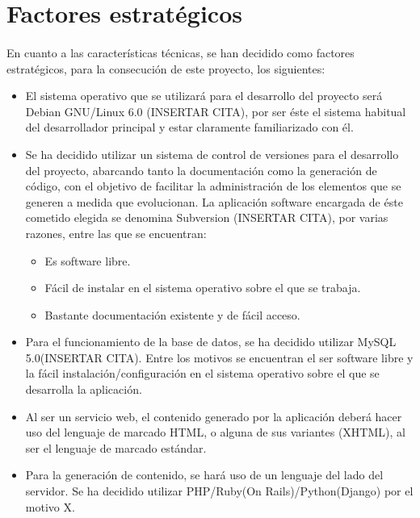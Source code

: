 \section{Factores estratégicos}

\paragraph{}En cuanto a las características técnicas, se han decidido como
factores estratégicos, para la consecución de este proyecto, los siguientes:

\begin{itemize}
   \item El sistema operativo que se utilizará para el desarrollo del proyecto
   será Debian GNU/Linux 6.0 (INSERTAR CITA), por ser éste el sistema habitual
   del desarrollador principal y estar claramente familiarizado con él.
   \item Se ha decidido utilizar un sistema de control de versiones para el
   desarrollo del proyecto, abarcando tanto la documentación como la generación
   de código, con el objetivo de facilitar la administración de los elementos
   que se generen a medida que evolucionan. La aplicación software encargada de
   éste cometido elegida se denomina Subversion (INSERTAR CITA), por varias
   razones, entre las que se encuentran:
   \begin{itemize}
      \item Es software libre.
      \item Fácil de instalar en el sistema operativo sobre el que se trabaja.
      \item Bastante documentación existente y de fácil acceso.
   \end{itemize}
   \item Para el funcionamiento de la base de datos, se ha decidido utilizar
   MySQL 5.0(INSERTAR CITA). Entre los motivos se encuentran el ser software
   libre y la fácil instalación/configuración en el sistema operativo sobre el
   que se desarrolla la aplicación.
   \item Al ser un servicio web, el contenido generado por la aplicación deberá
   hacer uso del lenguaje de marcado HTML, o alguna de sus variantes (XHTML), al
   ser el lenguaje de marcado estándar.
   \item Para la generación de contenido, se hará uso de un lenguaje del lado
   del servidor. Se ha decidido utilizar PHP/Ruby(On Rails)/Python(Django) por
   el motivo X.
\end{itemize}

